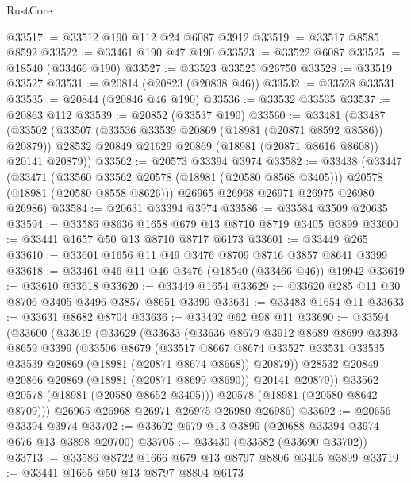 \begin{lexlean}{RustCore}
\begin{coremodule}
@33517 := @33512 @190 @112 @24 @6087 @3912
@33519 := @33517 @8585 @8592
@33522 := @33461 @190 @47 @190
@33523 := @33522 @6087
@33525 := @18540 (@33466 @190)
@33527 := @33523 @33525 @26750
@33528 := @33519 @33527
@33531 := @20814 (@20823 (@20838 @46))
@33532 := @33528 @33531
@33535 := @20844 (@20846 @46 @190)
@33536 := @33532 @33535
@33537 := @20863 @112
@33539 := @20852 (@33537 @190)
@33560 := @33481
    (@33487
      (@33502
        (@33507 (@33536 @33539 @20869 (@18981 (@20871 @8592 @8586)) @20879))
        @28532
        @20849
        @21629
        @20869
        (@18981 (@20871 @8616 @8608))
        @20141
        @20879))
@33562 := @20573 @33394 @3974
@33582 := @33438
    (@33447
      (@33471
        (@33560 @33562 @20578 (@18981 (@20580 @8568 @3405)))
        @20578
        (@18981 (@20580 @8558 @8626)))
      @26965
      @26968
      @26971
      @26975
      @26980
      @26986)
@33584 := @20631 @33394 @3974
@33586 := @33584 @3509 @20635
@33594 := @33586 @8636 @1658 @679 @13 @8710 @8719 @3405 @3899
@33600 := @33441 @1657 @50 @13 @8710 @8717 @6173
@33601 := @33449 @265
@33610 := @33601 @1656 @11 @49 @3476 @8709 @8716 @3857 @8641 @3399
@33618 := @33461 @46 @11 @46 @3476 (@18540 (@33466 @46)) @19942
@33619 := @33610 @33618
@33620 := @33449 @1654
@33629 := @33620 @285 @11 @30 @8706 @3405 @3496 @3857 @8651 @3399
@33631 := @33483 @1654 @11
@33633 := @33631 @8682 @8704
@33636 := @33492 @62 @98 @11
@33690 := @33594
    (@33600
      (@33619
        (@33629
          (@33633
            (@33636
              @8679
              @3912
              @8689
              @8699
              @3393
              @8659
              @3399
              (@33506
                @8679
                (@33517
                  @8667
                  @8674
                  @33527
                  @33531
                  @33535
                  @33539
                  @20869
                  (@18981 (@20871 @8674 @8668))
                  @20879))
              @28532
              @20849
              @20866
              @20869
              (@18981 (@20871 @8699 @8690))
              @20141
              @20879))
          @33562
          @20578
          (@18981 (@20580 @8652 @3405)))
        @20578
        (@18981 (@20580 @8642 @8709)))
      @26965
      @26968
      @26971
      @26975
      @26980
      @26986)
@33692 := @20656 @33394 @3974
@33702 := @33692 @679 @13 @3899 (@20688 @33394 @3974 @676 @13 @3898 @20700)
@33705 := @33430 (@33582 (@33690 @33702))
@33713 := @33586 @8722 @1666 @679 @13 @8797 @8806 @3405 @3899
@33719 := @33441 @1665 @50 @13 @8797 @8804 @6173

\end{coremodule}
\end{lexlean}
